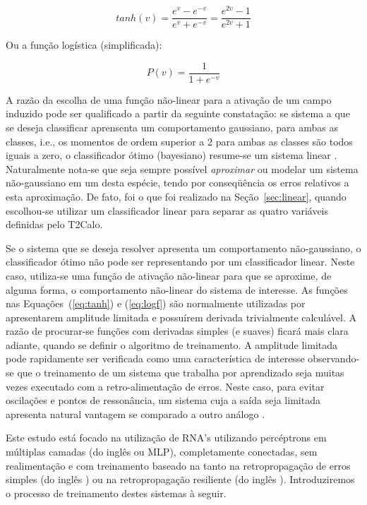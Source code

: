\begin{equation}
tanh(v) = \frac{e^v - e^{-v}}{e^v + e^{-v}} = \frac{e^{2v} - 1}{e^{2v} + 1}
\label{eq:tanh}
\end{equation}

Ou a função logística (simplificada):

\begin{equation}
P(v) = \frac{1}{1 + e^{-v}}
\label{eq:logf}
\end{equation}

A razão da escolha de uma função não-linear para a ativação de um campo
induzido pode ser qualificado a partir da seguinte constatação: se sistema a
que se deseja classificar aprensenta um comportamento gaussiano, para ambas as
classes, i.e., os momentos de ordem superior a $2$ para ambas as classes são
todos iguais a zero, o classificador ótimo (bayesiano) resume-se um sistema
linear \cite{haykin}. Naturalmente nota-se que seja sempre possível
\textit{aproximar} ou modelar um sistema não-gaussiano em um desta espécie,
tendo por conseqüência os erros relativos a esta aproximação. De fato, foi o
que foi realizado na Seção~\ref{sec:linear}, quando escolhou-se utilizar um
classificador linear para separar as quatro variáveis definidas pelo T2Calo.

Se o sistema que se deseja resolver apresenta um comportamento não-gaussiano,
o classificador ótimo não pode ser representando por um classificador
linear. Neste caso, utiliza-se uma função de ativação não-linear para que se
aproxime, de alguma forma, o comportamento não-linear do sistema de interesse.
As funções nas Equações~(\ref{eq:tanh}) e (\ref{eq:logf}) são normalmente
utilizadas por apresentarem amplitude limitada e possuírem derivada
trivialmente calculável. A razão de procurar-se funções com derivadas simples
(e suaves) ficará mais clara adiante, quando se definir o algoritmo de
treinamento. A amplitude limitada pode rapidamente ser verificada como uma
característica de interesse observando-se que o treinamento de um sistema que
trabalha por aprendizado seja muitas vezes executado com a retro-alimentação
de erros. Neste caso, para evitar oscilações e pontos de ressonância, um
sistema cuja a saída seja limitada apresenta natural vantagem se comparado a
outro análogo \cite{haykin}.

Este estudo está focado na utilização de RNA's utilizando percéptrons em
múltiplas camadas (do inglês  ou MLP),
completamente conectadas, sem realimentação e com treinamento baseado na tanto
na retropropagação de erros simples (do inglês ) ou na
retropropagação resiliente (do inglês ). Introduziremos o processo de treinamento destes sistemas à
seguir.

